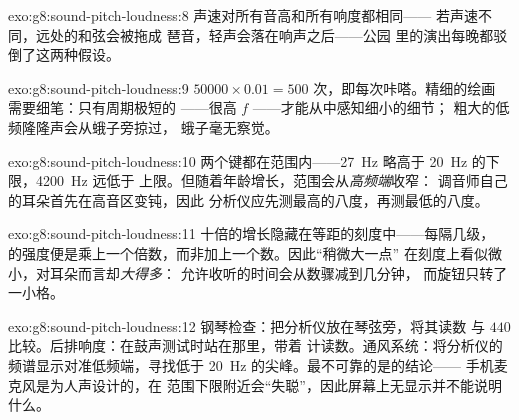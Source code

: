 \begin{solution}{exo:g8:sound-pitch-loudness:8}
声速对所有音高和所有响度都相同——
若声速不同，远处的和弦会被拖成
琶音，轻声会落在响声之后——公园
里的演出每晚都驳倒了这两种假设。
\end{solution}

\begin{solution}{exo:g8:sound-pitch-loudness:9}
$50000 \times 0.01 = 500$ 次，即每次咔嗒。精细的绘画
需要细笔：只有周期极短的
——很高 $f$ ——才能从中感知细小的细节；
粗大的低频隆隆声会从蛾子旁掠过，
蛾子毫无察觉。
\end{solution}

\begin{solution}{exo:g8:sound-pitch-loudness:10}
两个键都在范围内——\qty{27}{Hz} 略高于
\qty{20}{Hz} 的下限，\qty{4200}{Hz} 远低于
上限。但随着年龄增长，范围会从\emph{高频端}收窄：
调音师自己的耳朵首先在高音区变钝，因此
分析仪应先测最高的八度，再测最低的八度。
\end{solution}

\begin{solution}{exo:g8:sound-pitch-loudness:11}
十倍的增长隐藏在等距的刻度中——每隔几级，
的强度便是乘上一个倍数，而非加上一个数。因此“稍微大一点”
在刻度上看似微小，对耳朵而言却\emph{大得多}：
允许收听的时间会从数骤减到几分钟，
而旋钮只转了一小格。
\end{solution}

\begin{solution}{exo:g8:sound-pitch-loudness:12}
钢琴检查：把分析仪放在琴弦旁，将其读数
与 $440$ 比较。后排响度：在鼓声测试时站在那里，带着
计读数。通风系统：将分析仪的
频谱显示对准低频端，寻找低于
\qty{20}{Hz} 的尖峰。最不可靠的是的结论——
手机麦克风是为人声设计的，在
范围下限附近会“失聪”，因此屏幕上无显示并不能说明什么。
\end{solution}

